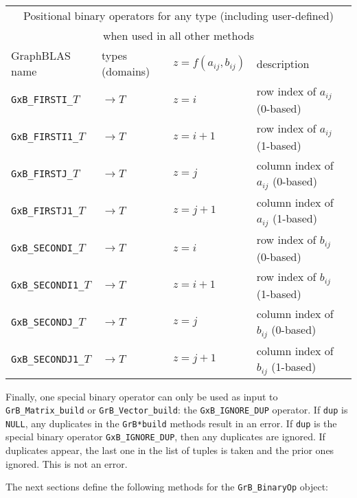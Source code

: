 \documentclass[12pt]{article}
\begin{document}
\vspace{0.2in}
{\footnotesize
\begin{tabular}{|llll|}
\hline
\multicolumn{4}{|c|}{Positional binary operators for any type (including user-defined)} \\
\multicolumn{4}{|c|}{when used in all other methods} \\
\hline
GraphBLAS name            & types (domains)   & $z=f(a_{ij},b_{ij})$      & description \\
\hline
\verb'GxB_FIRSTI_'$T$    & $ \rightarrow T$  & $z = i$       & row index of $a_{ij}$ (0-based) \\
\verb'GxB_FIRSTI1_'$T$   & $ \rightarrow T$  & $z = i+1$     & row index of $a_{ij}$ (1-based) \\
\verb'GxB_FIRSTJ_'$T$    & $ \rightarrow T$  & $z = j$       & column index of $a_{ij}$ (0-based) \\
\verb'GxB_FIRSTJ1_'$T$   & $ \rightarrow T$  & $z = j+1$     & column index of $a_{ij}$ (1-based) \\
\verb'GxB_SECONDI_'$T$   & $ \rightarrow T$  & $z = i$       & row index of $b_{ij}$ (0-based) \\
\verb'GxB_SECONDI1_'$T$  & $ \rightarrow T$  & $z = i+1$     & row index of $b_{ij}$ (1-based) \\
\verb'GxB_SECONDJ_'$T$   & $ \rightarrow T$  & $z = j$       & column index of $b_{ij}$ (0-based) \\
\verb'GxB_SECONDJ1_'$T$  & $ \rightarrow T$  & $z = j+1$     & column index of $b_{ij}$ (1-based) \\
\hline
\end{tabular}
}
\vspace{0.2in}

Finally, one special binary operator can only be used as input to
\verb'GrB_Matrix_build' or \verb'GrB_Vector_build': the \verb'GxB_IGNORE_DUP'
operator.  If \verb'dup' is \verb'NULL', any duplicates in the \verb'GrB*build'
methods result in an error.  If \verb'dup' is the special binary operator
\verb'GxB_IGNORE_DUP', then any duplicates are ignored.  If duplicates appear,
the last one in the list of tuples is taken and the prior ones ignored.  This
is not an error.

The next sections define the following methods for the \verb'GrB_BinaryOp'
object:
\end{document}
